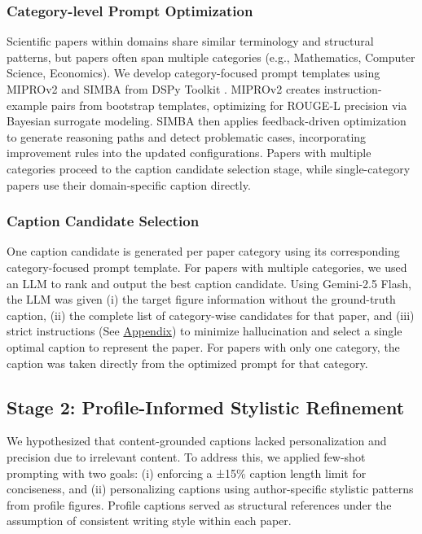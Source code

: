 \documentclass{article} %
\begin{document}
\subsubsection{Category-level Prompt Optimization }
Scientific papers within domains share similar terminology and structural patterns, but papers often span multiple categories (e.g., Mathematics, Computer Science, Economics). We develop category-focused prompt templates using MIPROv2 and SIMBA from DSPy Toolkit \citep{OpsahlOng2024} \citep{Vach2025}. MIPROv2 creates instruction-example pairs from bootstrap templates, optimizing for ROUGE-L precision via Bayesian surrogate modeling. SIMBA then applies feedback-driven optimization to generate reasoning paths and detect problematic cases, incorporating improvement rules into the updated configurations. Papers with multiple categories proceed to the caption candidate selection stage, while single-category papers use their domain-specific caption directly.
\subsubsection{Caption Candidate Selection}
One caption candidate is generated per paper category using its corresponding category-focused prompt template. For papers with multiple categories, we used an LLM to rank and output the best caption candidate. Using Gemini-2.5 Flash, the LLM was given (i) the target figure information without the ground-truth caption, (ii) the complete list of category-wise candidates for that paper, and (iii) strict instructions (See \hyperref[fig:caption-ranking-side]{Appendix}) to minimize hallucination and select a single optimal caption to represent the paper. For papers with only one category, the caption was taken directly from the optimized prompt for that category.

 \subsection{\textbf{Stage 2: Profile-Informed Stylistic Refinement} }

We hypothesized that content-grounded captions lacked personalization and precision due to irrelevant content. To address this, we applied few-shot prompting with two goals: (i) enforcing a ±15\% caption length limit for conciseness, and (ii) personalizing captions using author-specific stylistic patterns from profile figures. Profile captions served as structural references under the assumption of consistent writing style within each paper.
\end{document}
